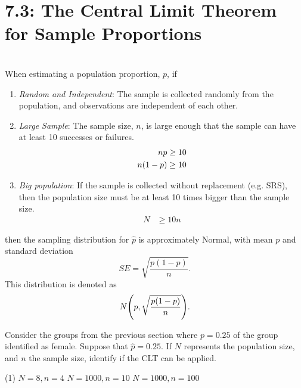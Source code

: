 \documentclass[../mathNotesPreamble]{subfiles}
\providecommand{\relscalefact}{1.4}
\begin{document}
\relscale{\relscalefact}
  \section{7.3: The Central Limit Theorem for Sample Proportions}
  \begin{defn*}\mbox{}\\
    When estimating a population proportion, $p$, if
    \begin{enumerate}
      \item \emph{Random and Independent}: The sample is collected randomly from the population, and observations are independent of each other.
      \item \emph{Large Sample}: The sample size, $n$, is large
        enough that the sample can have at least 10 successes or
        failures.
        \begin{align*}
          np&\geq 10\\
          n{\left(1-p\right)}&\geq 10
        \end{align*}
      \item \emph{Big population}: If the sample is collected
        without replacement (e.g. SRS), then the population size must be at
        least 10 times bigger than the sample size.
        \begin{align*}
          N&\geq 10n
        \end{align*}
    \end{enumerate}
    then the sampling distribution for $\hat{p}$ is approximately Normal, with mean $p$ and standard deviation
      \[SE=\sqrt{\frac{p(1-p)}{n}}.\]
    This distribution is denoted as
      \[N{\left(p,\sqrt{\frac{p(1-p)}{n}}\right)}.\]
  \end{defn*}
  \pagebreak

  \begin{ex*}
    Consider the groups from the previous section where $p=0.25$ of the group identified as female. Suppose that $\hat{p}=0.25$. If $N$ represents the population size, and $n$ the sample size, identify if the CLT can be applied.
  \end{ex*}
  \begin{extasks}[after-item-skip=\stretch{1}](1)
    \task $N=8, n=4$
    \task $N=1000, n=10$
    \task $N=1000, n=100$
  \end{extasks}
  \pagebreak
\end{document}
